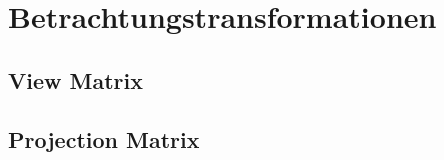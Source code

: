 \chapter{Betrachtungstransformationen}
\label{viewtransformation}

\section{View Matrix}

\section{Projection Matrix}
\label{projection}
